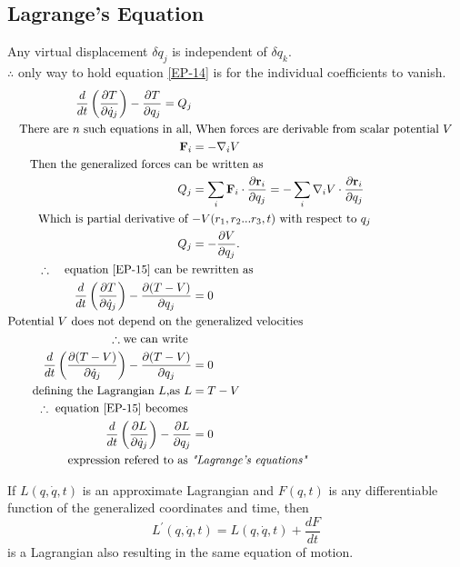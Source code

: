 \subsection{Lagrange's Equation}
Any virtual displacement $\delta q_j$ is independent of $\delta q_k.$\\
$\therefore$ \quad only way to hold equation \ref{EP-14} is for the individual coefficients to vanish.
\begin{align}
\frac{d}{d t}\left(\frac{\partial T}{\partial \dot{q}_{j}}\right)-\frac{\partial T}{\partial q_{j}}=Q_{j}\label{EP-15}\\
\text{There are $n$ such equations in all,}&\text{ When forces are derivable from scalar potential $V$}\notag\\
\mathbf{F}_{i}&=-\nabla_{i} V\notag\\
\text{Then the generalized forces can}&\text{ be written as}\notag\\
Q_{j}&=\sum_{i} \mathbf{F}_{i} \cdot \frac{\partial \mathbf{r}_{i}}{\partial q_{j}}=-\sum_{i} \nabla_{i} V \cdot \frac{\partial \mathbf{r}_{i}}{\partial q_{j}}\notag\\
\text{Which is partial derivative of }&\text{$-V(r_1,r_2...r_3,t)$ with respect to $q_j$}\notag\\
Q_{j}&=-\frac{\partial V}{\partial q_{j}} .\label{EP-16}\\
\text{$\therefore$ \quad equation \ref{EP-15} can be }&\text{rewritten as}\notag\\
\frac{d}{d t}\left(\frac{\partial T}{\partial \dot{q}_{j}}\right)-\frac{\partial (T-V)}{\partial q_{j}}&=0\\
\text{Potential $V$ does not depend on the}&\text{ generalized velocities }\notag\\
\therefore \text{we can write }\notag\\
\frac{d}{d t}\left( \frac{\partial (T-V)}{\partial \dot{q}_{j}} \right)  -\frac{\partial (T-V)}{\partial q_{j}}&=0\notag\\
\text{defining the Lagrangian $L$,as }L&=T-V\notag\\
\therefore \text{ equation \ref{EP-15} becomes }&\notag\\
\frac{d}{d t}\left(\frac{\partial L}{\partial \dot{q}_{j}}\right)-\frac{\partial L}{\partial q_{j}}&=0\notag\\
\text{expression refered to as }&\textit{"Lagrange's equations"}\notag
\end{align}
\begin{note}
	If $L(q,\dot{q},t)$ is an approximate Lagrangian and $F(q,t)$ is any differentiable function of the generalized coordinates and time, then
	$$L^{\prime}(q, \dot{q}, t)=L(q, \dot{q}, t)+\frac{d F}{d t}$$
	is a Lagrangian also resulting in the same equation of motion.
\end{note}
